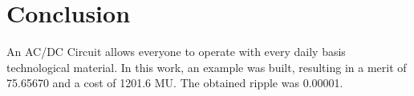 \section{Conclusion}
\label{sec:conclusion}
\vspace{3mm}

An AC/DC Circuit allows everyone to operate with every daily basis technological material. In this work, an example was built, resulting in a merit of 75.65670 and a cost of 1201.6 MU. The obtained ripple was 0.00001.
